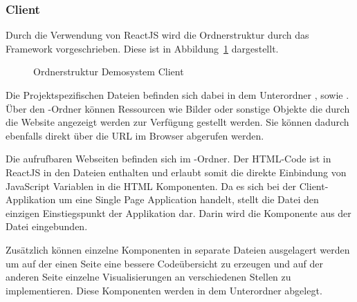 \subsubsection{Client}
Durch die Verwendung von ReactJS wird die Ordnerstruktur durch das Framework vorgeschrieben.
Diese ist in Abbildung~\ref{fig:OrdnerstrukturClient} dargestellt.
\begin{figure}[H]
    \caption{Ordnerstruktur Demosystem Client}
    \label{fig:OrdnerstrukturClient}
\end{figure}
Die Projektspezifischen Dateien befinden sich dabei in dem Unterordner , sowie .
Über den -Ordner können Ressourcen wie Bilder oder sonstige Objekte die durch die Website angezeigt werden zur Verfügung gestellt werden.
Sie können dadurch ebenfalls direkt über die URL im Browser abgerufen werden.

Die aufrufbaren Webseiten befinden sich im -Ordner.
Der \ac{HTML}-Code ist in ReactJS in den  Dateien enthalten und erlaubt somit die direkte Einbindung von JavaScript Variablen in die \ac{HTML} Komponenten.
Da es sich bei der Client-Applikation um eine Single Page Application handelt, stellt die  Datei den einzigen Einstiegspunkt der Applikation dar.
Darin wird die Komponente  aus der Datei  eingebunden.

Zusätzlich können einzelne Komponenten in separate Dateien ausgelagert werden um auf der einen Seite eine bessere Codeübersicht zu erzeugen und auf der anderen Seite einzelne Visualisierungen an verschiedenen Stellen zu implementieren.
Diese Komponenten werden in dem Unterordner  abgelegt.

